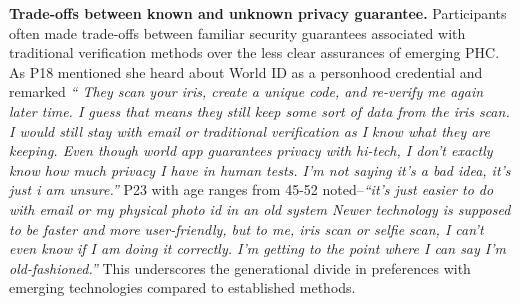 \textbf{Trade-offs between known and unknown privacy guarantee.} 
Participants often made trade-offs between familiar security guarantees associated with traditional verification methods over the less clear assurances of emerging PHC. As P18 mentioned she heard about World ID as a personhood credential and remarked \textit{``
They scan your iris, create a unique code, and re-verify me again later time. I guess that means they still keep some sort of data from the iris scan. I would still stay with email or traditional verification as I know what they are keeping. Even though world app guarantees privacy with hi-tech, I don’t exactly know how much privacy I have in human tests. I’m not saying it’s a bad idea, it's just i am unsure.''} 
P23 with age ranges from 45-52 noted--\textit{``it's just easier to do with email or my physical photo id in an old system 
Newer technology is supposed to be faster and more user-friendly, but to me, iris scan or selfie scan, I can't even know if I am doing it correctly. I’m getting to the point where I can say I’m old-fashioned.''} This underscores the generational divide in preferences with emerging technologies compared to established methods.







